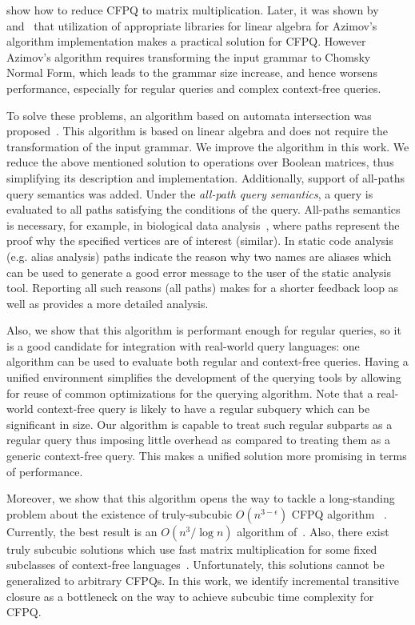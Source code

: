 \cite{Azimov:2018:CPQ:3210259.3210264} show how to reduce CFPQ to matrix multiplication.
Later, it was shown by~\cite{Mishin:2019:ECP:3327964.3328503} and~\cite{10.1145/3398682.3399163} that utilization of appropriate libraries for linear algebra for Azimov's algorithm implementation makes a practical solution for CFPQ.
However Azimov's algorithm requires transforming the input grammar to Chomsky Normal Form, which leads to the grammar size increase, and hence worsens performance, especially for regular queries and complex context-free queries.

To solve these problems, an algorithm based on automata intersection was proposed~\citep{10.1007/978-3-030-54832-2_6}.
This algorithm is based on linear algebra and does not require the transformation of the input grammar.
We improve the algorithm in this work.
We reduce the above mentioned solution to operations over Boolean matrices, thus simplifying its description and implementation. Additionally, support of all-paths query semantics was added. Under the \textit{all-path query semantics}, a query is evaluated to all paths satisfying the conditions of the query. All-paths semantics is necessary, for example, in biological data analysis~\citep{GraphQueryWithEarley}, where paths represent the proof why the specified vertices are of interest (similar). In static code analysis (e.g. alias analysis) paths indicate the reason why two names are aliases which can be used to generate a good error message to the user of the static analysis tool. Reporting all such reasons (all paths) makes for a shorter feedback loop as well as provides a more detailed analysis.

Also, we show that this algorithm is performant enough for regular queries, so it is a good candidate for integration with real-world query languages: one algorithm can be used to evaluate both regular and context-free queries. Having a unified environment simplifies the development of the querying tools by allowing for reuse of common optimizations for the querying algorithm. 
Note that a real-world context-free query is likely to have a regular subquery which can be significant in size. Our algorithm is capable to treat such regular subparts as a regular query thus imposing little overhead as compared to treating them as a generic context-free query. This makes a unified solution more promising in terms of performance. 

Moreover, we show that this algorithm opens the way to tackle a long-standing problem about the existence of truly-subcubic $O(n^{3-\epsilon})$ CFPQ algorithm ~\citep{10.1145/1328438.1328460, Yannakakis}.
Currently, the best result is an $O(n^3/\log{n})$ algorithm of~\cite{10.1145/1328438.1328460}.
Also, there exist truly subcubic solutions which use fast matrix multiplication for some fixed subclasses of context-free languages~\citep{8249039}.
Unfortunately, this solutions cannot be generalized to arbitrary CFPQs.
In this work, we identify incremental transitive closure as a bottleneck on the way to achieve subcubic time complexity for CFPQ.

